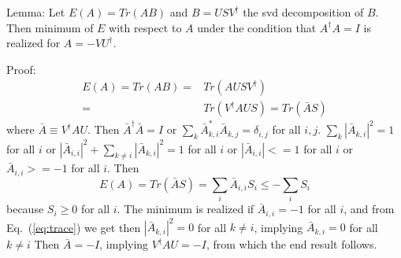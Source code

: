 \documentclass[twocolumn,showpacs,preprintnumbers,amsmath,amssymb,prb]{revtex4}
\begin{document}
Lemma:
Let $E(A) = Tr(AB)$ and $B = USV^\dagger$ the svd decomposition of $B$.
Then minimum of $E$ with respect to $A$ under the condition that $A^\dagger A = I$
is realized for $A = -VU^\dagger.$


Proof: 
\begin{align}
E(A) = Tr(AB) =& Tr(AUSV^\dagger)\nonumber\\
 =& Tr(V^\dagger A U S) = Tr(\bar{A} S)
\label{eq:trace}
\end{align}
where $\bar{A} \equiv V^\dagger A U.$  Then $\bar{A}^\dagger \bar{A} = I$ or
$\sum_k \bar{A}^*_{k,i}\bar{A}_{k,j} = \delta_{i,j}$ for all $i,j$.
$\sum_k |\bar{A}_{k,i}|^2 = 1$ for all $i$ or
$|\bar{A}_{i,i}|^2 + \sum_{k\neq i} |\bar{A}_{k,i}|^2 = 1$ for all $i$ or
$|\bar{A}_{i,i}| <= 1$ for all $i$ or
$\bar{A}_{i,i} >= -1$ for all $i$.
Then 
\begin{equation}
E(A) = Tr(\bar{A} S) = \sum_i \bar{A}_{i,i} S_i \le -\sum_i S_i
\end{equation}
because $S_i \ge 0$ for all $i$.
The minimum is realized if $\bar{A}_{i,i} = -1$ for all $i$, and 
from Eq.~(\ref{eq:trace}) we get
then $|\bar{A}_{k,i}|^2 = 0$ for all $k\neq i$,
implying $\bar{A}_{k,i} = 0$ for all $k\neq i$
Then $\bar{A} = -I$, implying $V^\dagger A U = -I$, from which the end result follows.
\end{document}
